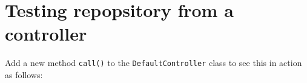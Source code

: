 \documentclass[a4paperpaper,openright]{book}
\newenvironment{Shaded}{}{}
\newcommand{\CommentTok}[1]{\textcolor[rgb]{0.38,0.63,0.69}{\textit{#1}}}
\newcommand{\DecValTok}[1]{\textcolor[rgb]{0.25,0.63,0.44}{#1}}
\newcommand{\FunctionTok}[1]{\textcolor[rgb]{0.02,0.16,0.49}{#1}}
\newcommand{\KeywordTok}[1]{\textcolor[rgb]{0.00,0.44,0.13}{\textbf{#1}}}
\newcommand{\NormalTok}[1]{#1}
\newcommand{\OtherTok}[1]{\textcolor[rgb]{0.00,0.44,0.13}{#1}}
\begin{document}
\begin{Shaded}
\end{Shaded}

\hypertarget{testing-repopsitory-from-a-controller}{%
\section{Testing repopsitory from a
controller}\label{testing-repopsitory-from-a-controller}}

Add a new method \texttt{call()} to the \texttt{DefaultController} class
to see this in action as follows:
\end{document}
